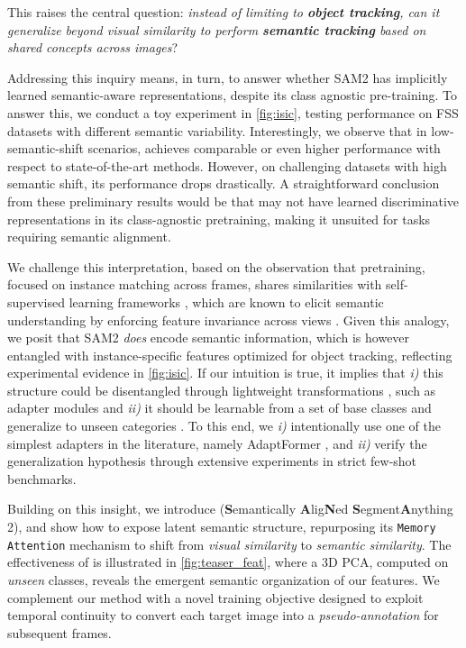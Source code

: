 This raises the central question: \textit{instead of limiting \sam{} to \textbf{object tracking}, can it generalize beyond visual similarity to perform \textbf{semantic tracking} based on shared concepts across images}? 

Addressing this inquiry means, in turn, to answer whether SAM2
has implicitly learned semantic-aware representations, despite its class agnostic pre-training. To answer this, we conduct a toy experiment in \cref{fig:isic}, testing \sam{} performance on FSS datasets with different semantic variability. Interestingly, we observe that in low-semantic-shift scenarios, \sam{} achieves comparable or even higher performance with respect to state-of-the-art methods. However, on challenging datasets with high semantic shift, its performance drops drastically. 
A straightforward conclusion from
these preliminary results would be that \sam{} may not have learned discriminative representations in its class-agnostic pretraining, making it unsuited for tasks requiring semantic alignment.

We challenge this interpretation, based on the observation that \sam{} pretraining, focused on instance matching across frames, shares similarities with self-supervised learning frameworks \cite{yang2022inscon, yang2021instance, henaff2021efficient, bardes2022vicregl}, which are known to elicit semantic understanding by enforcing feature invariance across views \cite{caron2021emerging, bardes2021vicreg}.
Given this analogy, we posit that SAM2 \emph{does} encode semantic information, which is however entangled with instance-specific features optimized for object tracking, reflecting experimental evidence in \cref{fig:isic}. If our intuition is true, it implies that \textit{i)} this structure could be disentangled through lightweight transformations \cite{aghajanyan2020intrinsic, hu2022lora, li2018measuring}, such as adapter modules and \textit{ii)} it should be learnable from a set of base classes and generalize to unseen categories \cite{rusu2018meta, cheng2023meta}. 
To this end, we \textit{i)} intentionally use one of the simplest adapters in the literature, namely AdaptFormer \cite{houlsby2019adapter}, and \textit{ii)} verify the generalization hypothesis through extensive experiments in strict few-shot benchmarks.


Building on this insight, we introduce \textbf{\ours{}} (\textbf{S}emantically \textbf{A}lig\textbf{N}ed  \textbf{S}egment\textbf{A}nything 2), and show how to expose \sam{} latent semantic structure, repurposing its \texttt{Memory Attention} mechanism to shift from \textit{visual similarity} to \textit{semantic similarity}. The effectiveness of \ours{} is illustrated in \cref{fig:teaser_feat}, where a 3D PCA, computed on \textit{unseen} classes, reveals the emergent semantic organization of our features. 
We complement our method with a novel training objective designed to exploit \sam{} temporal continuity to convert each target image into a \textit{pseudo-annotation} for subsequent frames.

